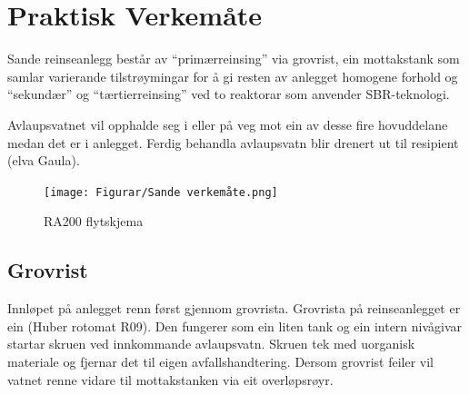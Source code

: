 \newpage
\section{Praktisk Verkemåte}
\thispagestyle{fancy}

Sande reinseanlegg består av ``primærreinsing'' via grovrist, ein mottakstank 
som samlar varierande tilstrøymingar for å gi resten av anlegget homogene forhold og
``sekundær'' og ``tærtierreinsing'' ved to reaktorar som anvender \gls{SBR}-teknologi.

Avlaupsvatnet vil opphalde seg i eller på veg mot ein av desse fire hovuddelane medan det er i anlegget.
Ferdig behandla avlaupsvatn blir drenert ut til resipient (elva Gaula). 

\begin{figure}[htbp]
    \centering
    \texttt{[image: Figurar/Sande verkemåte.png]}
    \caption{\gls{RA}200 flytskjema}\label{fig:SandeVerkemaate}
\end{figure}


\subsection{Grovrist}
Innløpet på anlegget renn først gjennom grovrista. Grovrista på reinseanlegget
er ein (Huber rotomat R09). Den fungerer som ein liten tank og ein intern nivågivar startar
skruen ved innkommande avlaupsvatn. Skruen tek med uorganisk materiale og fjernar det til eigen avfallshandtering.
Dersom grovrist feiler vil vatnet renne vidare til mottakstanken via eit overløpsrøyr.

